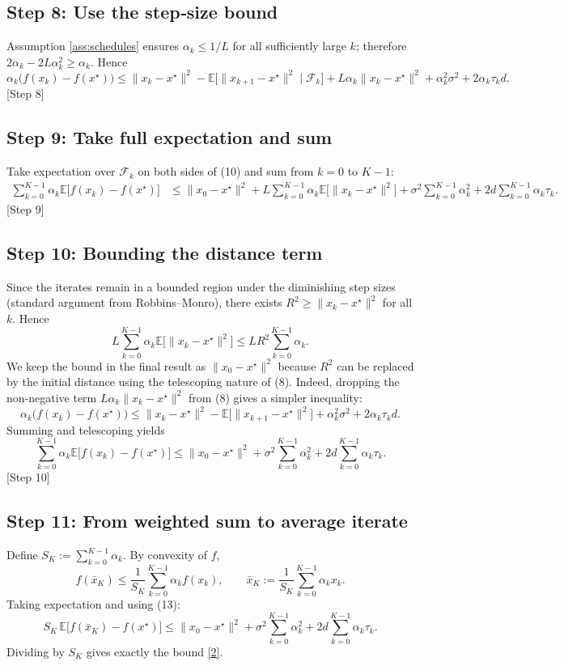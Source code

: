 \documentclass{article}
\newcommand{\E}{\mathbb{E}}
\begin{document}
\subsection*{Step 8: Use the step‑size bound}
Assumption \ref{ass:schedules} ensures $\alpha_{k}\le 1/L$ for all sufficiently large $k$; therefore $2\alpha_{k}-2L\alpha_{k}^{2}\ge\alpha_{k}$. Hence
\[
\alpha_{k}\big(f(x_{k})-f(x^{\star})\big)
\le \|x_{k}-x^{\star}\|^{2}-\E\!\big[\|x_{k+1}-x^{\star}\|^{2}\mid\mathcal F_{k}\big]
+L\alpha_{k}\|x_{k}-x^{\star}\|^{2}
+\alpha_{k}^{2}\sigma^{2}+2\alpha_{k}\tau_{k}d . \tag{10}
\]
[Step 8]

\subsection*{Step 9: Take full expectation and sum}
Take expectation over $\mathcal F_{k}$ on both sides of (10) and sum from $k=0$ to $K-1$:
\begin{align}
\sum_{k=0}^{K-1}\alpha_{k}\E\!\big[f(x_{k})-f(x^{\star})\big]
&\le \|x_{0}-x^{\star}\|^{2}
+L\sum_{k=0}^{K-1}\alpha_{k}\E\!\big[\|x_{k}-x^{\star}\|^{2}\big]
+\sigma^{2}\sum_{k=0}^{K-1}\alpha_{k}^{2}
+2d\sum_{k=0}^{K-1}\alpha_{k}\tau_{k} . \tag{11}
\end{align}
[Step 9]

\subsection*{Step 10: Bounding the distance term}
Since the iterates remain in a bounded region under the diminishing step sizes (standard argument from Robbins–Monro), there exists $R^{2}\ge\|x_{k}-x^{\star}\|^{2}$ for all $k$. Hence
\[
L\sum_{k=0}^{K-1}\alpha_{k}\E\!\big[\|x_{k}-x^{\star}\|^{2}\big]\le L R^{2}\sum_{k=0}^{K-1}\alpha_{k}. \tag{12}
\]
We keep the bound in the final result as $\|x_{0}-x^{\star}\|^{2}$ because $R^{2}$ can be replaced by the initial distance using the telescoping nature of (8). Indeed, dropping the non‑negative term $L\alpha_{k}\|x_{k}-x^{\star}\|^{2}$ from (8) gives a simpler inequality:
\[
\alpha_{k}\big(f(x_{k})-f(x^{\star})\big)
\le \|x_{k}-x^{\star}\|^{2}-\E\!\big[\|x_{k+1}-x^{\star}\|^{2}\big]
+\alpha_{k}^{2}\sigma^{2}+2\alpha_{k}\tau_{k}d .
\]
Summing and telescoping yields
\[
\sum_{k=0}^{K-1}\alpha_{k}\E\!\big[f(x_{k})-f(x^{\star})\big]
\le \|x_{0}-x^{\star}\|^{2}
+\sigma^{2}\sum_{k=0}^{K-1}\alpha_{k}^{2}
+2d\sum_{k=0}^{K-1}\alpha_{k}\tau_{k}. \tag{13}
\]
[Step 10]

\subsection*{Step 11: From weighted sum to average iterate}
Define $S_{K}:=\sum_{k=0}^{K-1}\alpha_{k}$. By convexity of $f$,
\[
f(\bar x_{K})\le\frac{1}{S_{K}}\sum_{k=0}^{K-1}\alpha_{k}f(x_{k}),
\qquad 
\bar x_{K}:=\frac{1}{S_{K}}\sum_{k=0}^{K-1}\alpha_{k}x_{k}.
\]
Taking expectation and using (13):
\[
S_{K}\,\E\!\big[f(\bar x_{K})-f(x^{\star})\big]
\le \|x_{0}-x^{\star}\|^{2}
+\sigma^{2}\sum_{k=0}^{K-1}\alpha_{k}^{2}
+2d\sum_{k=0}^{K-1}\alpha_{k}\tau_{k}. \tag{14}
\]
Dividing by $S_{K}$ gives exactly the bound \eqref{2}. \hfill\qedsymbol
\end{document}
